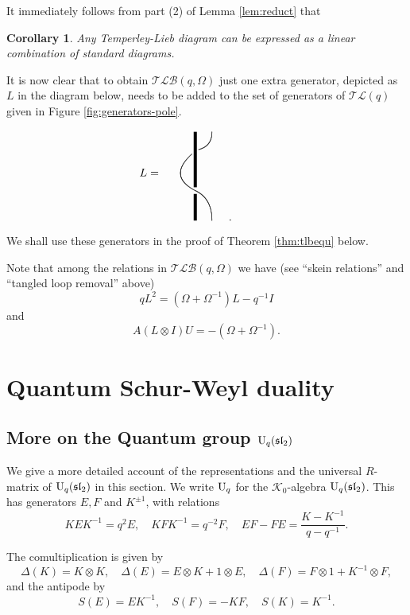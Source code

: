 \documentclass[12pt]{amsart}
\newtheorem{corollary}[theorem]{Corollary}
\theoremstyle{definition}
\theoremstyle{remark}
\numberwithin{equation}{section}
\newcommand{\CK}{{\mathcal K}}
\newcommand{\be}{\begin{equation}}
\newcommand{\ee}{\end{equation}}
\newcommand{\inv}{^{-1}}
\newcommand{\U}{{\rm{U}}}
\newcommand{\Uq}{{{\rm U}_q}}
\newcommand{\fsl}{{\mathfrak {sl}}}
\newcommand{\ot}{\otimes}
\newcommand{\TLC}{\mathcal{TL}}
\newcommand{\TLBC}{\mathcal{TLB}}
\begin{document}
It immediately follows from part (2) of Lemma \ref{lem:reduct} that 
\begin{corollary}
Any Temperley-Lieb diagram can be expressed as a linear combination of standard diagrams.
\end{corollary}




It is now clear that to obtain $\TLBC(q,\Omega)$ just one extra generator, depicted as $L$ in the diagram below, needs to be added to the set of generators of $\TLC(q)$ given in Figure \ref{fig:generators-pole}. 
\[
\begin{picture}(150, 90)(-80,-5)
\put(-65, 40){$L=$}
{
\linethickness{1mm}
\put(-15, 0){\line(0, 1){24}}
\put(-15, 30){\line(0, 1){50}}
}
\qbezier(-18, 60)(-40, 40)(-15, 27)
\qbezier(-15, 27)(0, 20)(0, 0)
\qbezier(0, 80)(0, 67)(-12, 64)
\put(15, 0){.}
\end{picture}
%
\]
We shall use these generators in the proof of Theorem \ref{thm:tlbequ} below.

Note that among the relations in $\TLBC(q,\Omega)$ we have (see ``skein relations'' and ``tangled loop removal'' above)
\be\label{eq:skein}
qL^2=(\Omega+\Omega\inv)L-q\inv I
\ee
and
\be\label{eq:loop}
A(L\ot I)U=-(\Omega+\Omega\inv).
\ee








\section{Quantum Schur-Weyl duality}\label{sect:Schur-Weyl}

%
%
\subsection{More on the Quantum group $\U_q(\fsl_2)$}
%

We give a more detailed account of the representations and the universal $R$-matrix of $\U_q(\fsl_2)$ in this section. 
We write $\Uq$ for the $\CK_0$-algebra $\U_q(\fsl_2)$. This has generators $E,F$ and $K^{\pm 1}$, with relations
\[
KEK\inv=q^2E,\quad  KFK\inv=q^{-2}F, \quad EF-FE=\frac{K-K\inv}{q-q\inv}.\] 

The comultiplication is given by
\[
\Delta(K)=K\ot K,\quad \Delta(E)=E\ot K+1\ot E,\quad \Delta(F)=F\ot 1+K\inv\ot F,
\]
and the antipode by
\[
S(E)=EK\inv,\quad S(F)=-KF,\quad S(K)=K\inv.
\]
\end{document}
